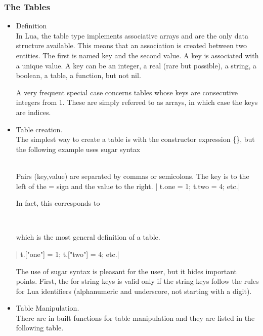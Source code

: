 \subsubsection{The Tables} %
\label{ssub:the_tables}

\begin{itemize}

\item Definition\\
In Lua, the table type implements associative arrays and are the only data structure available. This means that an association is created between two entities. The first is named key and the second value. A key is associated with a unique value. A key can be an integer, a real (rare but possible), a string, a boolean, a table, a function, but not nil.

  A very frequent special case concerns tables whose keys are consecutive integers from 1. These are simply referred to as arrays, in which case the keys are indices.


  \item Table creation.\\
  The simplest way to create a table is with the constructor expression \{\}, but the following example uses sugar syntax

  \begin{mybox}
     \\
    Pairs (key,value) are separated by commas or semicolons. The key is to the left of the = sign and the value to the right.
   | t.one = 1; t.two = 4; etc.|
  \end{mybox}

  In fact, this corresponds to

  \begin{mybox}
     \\
  \end{mybox}

  which is the most general definition of a table.

   | t.["one"] = 1; t.["two"] = 4; etc.|

  The use of sugar syntax is pleasant for the user, but it hides important points. First, the  for string keys is valid only if the string keys  follow the rules for Lua identifiers (alphanumeric and underscore, not starting with a digit).

  \item Table Manipulation.\\
There are in built functions for table manipulation and they are listed in the following table.


\end{itemize}
